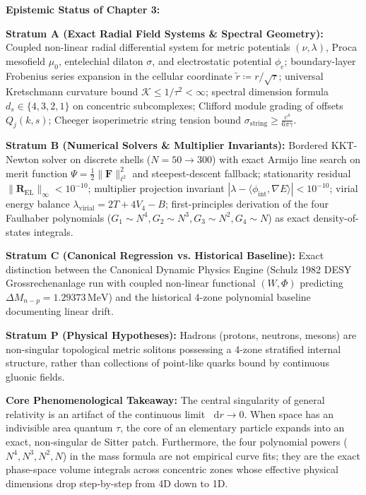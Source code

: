 \documentclass[
    12pt,
    a4paper,
    headings=normal,
    twoside=false,
    open=any,
    parskip=half
]{scrbook}
\newcommand{\diff}{\mathop{}\!\mathrm{d}}
\begin{document}
\begin{firewallbox}
\textbf{Epistemic Status of Chapter 3:}\par\smallskip\noindent
\textbf{Stratum A (Exact Radial Field Systems \& Spectral Geometry):} Coupled non-linear radial differential system for metric potentials $(\nu, \lambda)$, Proca mesofield $\mu_0$, entelechial dilaton $\sigma$, and electrostatic potential $\phi_e$; boundary-layer Frobenius series expansion in the cellular coordinate $\tilde{r} \coloneqq r/\sqrt{\tau}$; universal Kretschmann curvature bound $\mathcal{K} \le 1/\tau^2 < \infty$; spectral dimension formula $d_s \in \{4, 3, 2, 1\}$ on concentric subcomplexes; Clifford module grading of offsets $Q_j(k, s)$; Cheeger isoperimetric string tension bound $\sigma_{\text{string}} \ge \frac{c^4}{6\pi\gamma}$.\par\smallskip\noindent
\textbf{Stratum B (Numerical Solvers \& Multiplier Invariants):} Bordered KKT-Newton solver on discrete shells ($N = 50 \to 300$) with exact Armijo line search on merit function $\Psi = \frac{1}{2}\|\mathbf{F}\|_{\ell^2}^2$ and steepest-descent fallback; stationarity residual $\|\mathbf{R}_{\text{EL}}\|_\infty < 10^{-10}$; multiplier projection invariant $|\lambda - \langle\phi_{\text{int}}, \nabla E\rangle| < 10^{-10}$; virial energy balance $\lambda_{\text{virial}} = 2T + 4V_4 - B$; first-principles derivation of the four Faulhaber polynomials ($G_1 \sim N^4, G_2 \sim N^3, G_3 \sim N^2, G_4 \sim N$) as exact density-of-states integrals.\par\smallskip\noindent
\textbf{Stratum C (Canonical Regression vs. Historical Baseline):} Exact distinction between the Canonical Dynamic Physics Engine (Schulz 1982 DESY Grossrechenanlage run with coupled non-linear functional $(W, \Phi)$ predicting $\Delta M_{n-p} = 1.29373\,\text{MeV}$) and the historical 4-zone polynomial baseline documenting linear drift.\par\smallskip\noindent
\textbf{Stratum P (Physical Hypotheses):} Hadrons (protons, neutrons, mesons) are non-singular topological metric solitons possessing a 4-zone stratified internal structure, rather than collections of point-like quarks bound by continuous gluonic fields.\par\smallskip\noindent
\textbf{Core Phenomenological Takeaway:} The central singularity of general relativity is an artifact of the continuous limit $\diff r \to 0$. When space has an indivisible area quantum $\tau$, the core of an elementary particle expands into an exact, non-singular de Sitter patch. Furthermore, the four polynomial powers ($N^4, N^3, N^2, N$) in the mass formula are not empirical curve fits; they are the exact phase-space volume integrals across concentric zones whose effective physical dimensions drop step-by-step from 4D down to 1D.
\end{firewallbox}
\end{document}
